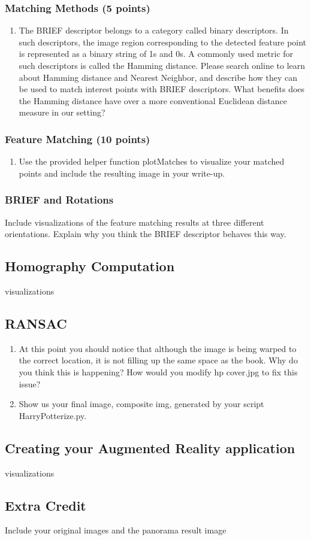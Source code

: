\documentclass[a3paper,12pt]{extarticle} %
\begin{document}
    \subsubsection{Matching Methods (5 points)}
    \begin{enumerate}
        \item The BRIEF descriptor belongs to a category called binary descriptors. In such descriptors, the image region corresponding to the detected feature point is represented as a binary string of 1s and 0s. A commonly used metric for such descriptors is called the Hamming distance. Please search online to learn about Hamming distance and Nearest Neighbor, and describe how they can be used to match interest points with BRIEF descriptors. What benefits does the Hamming distance have over a more conventional Euclidean distance measure in our setting?
    \end{enumerate}

    \subsubsection{Feature Matching (10 points)}
    \begin{enumerate}
        \item  Use the provided helper function plotMatches
        to visualize your matched points and include the resulting image in your write-up.
    \end{enumerate}
    \subsubsection{BRIEF and Rotations}
    Include visualizations of the feature matching results at three different orientations. Explain why you think the BRIEF descriptor behaves this way.
    \subsection{Homography Computation}
    visualizations
    \subsection{RANSAC}
\begin{enumerate}
    \item At this point you should notice that although the image is being warped to the
    correct location, it is not filling up the same space as the book. Why do you think
    this is happening? How would you modify hp cover.jpg to fix this issue?
    \item Show us your final image, composite img, generated by your
    script HarryPotterize.py. 
\end{enumerate}
\subsection{Creating your Augmented Reality application}
visualizations
\subsection{Extra Credit}
Include your original images and the panorama result image
\end{document}
